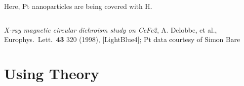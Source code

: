 \documentclass[10pt, xcolor=x11names, compress]{beamer}
\begin{document}
\begin{frame}
\begin{columns} [T]
\begin{column}{0.4\linewidth}
      Here, Pt nanoparticles are being covered with H.
    \end{column}
  \end{columns}

  \begin{bottomnote}[0.52][19.25]
    \textit{X-ray magnetic circular dichroism study on CeFe2},
    A. Delobbe, et al., Europhys.\ Lett.\ \textbf{43} 320 (1998),
    [LightBlue4]; Pt data courtesy
    of Simon Bare
  \end{bottomnote}
\end{frame}

\section[Theory]{Using Theory}
\end{document}
